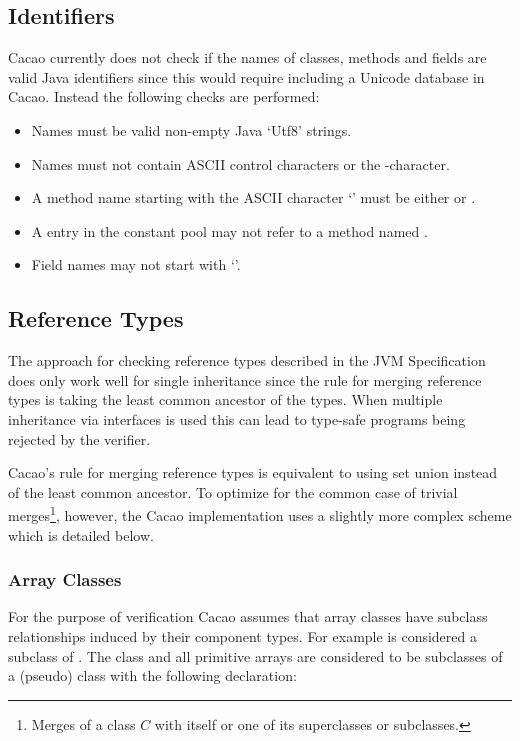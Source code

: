\subsection{Identifiers}

Cacao currently does not check if the names of classes, methods and
fields are valid Java identifiers since this would require including a
Unicode database in Cacao. Instead the following checks are performed:

\begin{itemize}
\item Names must be valid non-empty Java `Utf8' strings.
\item Names must not contain ASCII control characters or the
      -character.
\item A method name starting with the ASCII character `\code{<}' must be
      either  or .
\item A  entry in the constant pool may not
      refer to a method named .
\item Field names may not start with `\code{<}'.

\end{itemize}

\subsection{Reference Types}

The approach for checking reference types described in the JVM
Specification \cite{javavm99} does only work well for single
inheritance since the rule for merging reference types is taking the
least common ancestor of the types. When multiple inheritance via
interfaces is used this can lead to type-safe programs being rejected
by the verifier.

Cacao's rule for merging reference types is equivalent to using set
union instead of the least common ancestor. To optimize for the common
case of trivial merges\footnote{Merges of a class $C$ with itself or
one of its superclasses or subclasses.}, however, the Cacao
implementation uses a slightly more complex scheme which is detailed
below.

\subsubsection{Array Classes}

For the purpose of verification Cacao assumes that array classes have
subclass relationships induced by their component types. For example
 is considered a subclass of . The
class  and all primitive arrays are considered to be
subclasses of a (pseudo) class  with the following
declaration:

